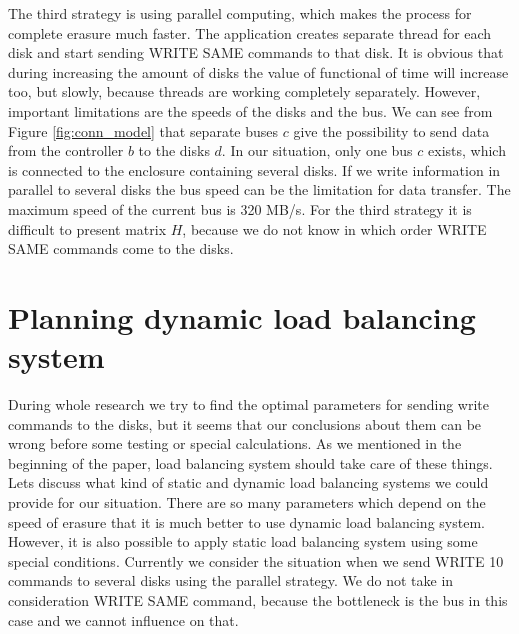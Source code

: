 The third strategy is using parallel computing, which makes the process for complete erasure much faster. The application creates separate thread for each disk and start sending WRITE SAME commands to that disk. It is obvious that during increasing the amount of disks the value of functional of time will increase too, but slowly, because threads are working completely separately. However, important limitations are the speeds of the disks and the bus. We can see from Figure \ref{fig:conn_model} that separate buses $c$ give the possibility to send data from the controller $b$ to the disks $d$. In our situation, only one bus $c$ exists, which is connected to the enclosure containing several disks. If we write information in parallel to several disks the bus speed can be the limitation for data transfer. The maximum speed of the current bus is 320 MB/s. For the third strategy it is difficult to present matrix $H$, because we do not know in which order WRITE SAME commands come to the disks.


\section{Planning dynamic load balancing system}

During whole research we try to find the optimal parameters for sending write commands to the disks, but it seems that our conclusions about them can be wrong before some testing or special calculations. As we mentioned in the beginning of the paper, load balancing system should take care of these things. Lets discuss what kind of static and dynamic load balancing systems we could provide for our situation. There are so many parameters which depend on the speed of erasure that it is much better to use dynamic load balancing system. However, it is also possible to apply static load balancing system using some special conditions. Currently we consider the situation when we send WRITE 10 commands to several disks using the parallel strategy. We do not take in consideration WRITE SAME command, because the bottleneck is the bus in this case and we cannot influence on that.

